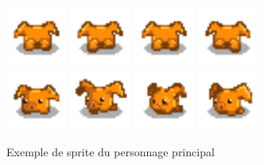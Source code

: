 \documentclass{article}
\begin{document}
\begin{figure}[h]
        \\
        \includegraphics[height = 2cm]{haricot/back_0.png}
        \includegraphics[height = 2cm]{haricot/back_1.png}
        \includegraphics[height = 2cm]{haricot/back_2.png}
        \includegraphics[height = 2cm]{haricot/back_3.png}
        \\
        \includegraphics[height = 2cm]{haricot/left_0.png}
        \includegraphics[height = 2cm]{haricot/left_1.png}
        \includegraphics[height = 2cm]{haricot/left_2.png}
        \includegraphics[height = 2cm]{haricot/left_3.png}
        \caption{Exemple de sprite du personnage principal}\label{lapin_devant}
    \end{figure}
\end{document}
